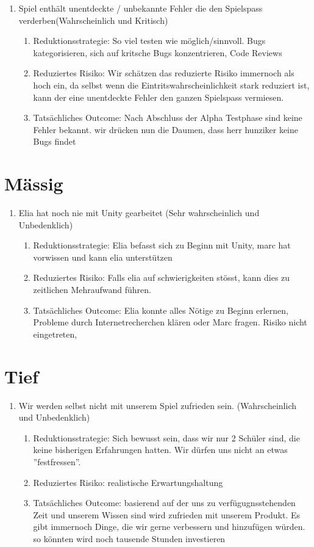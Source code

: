 \begin{enumerate}
    \item Spiel enthält unentdeckte / unbekannte Fehler die den Spielspass verderben(Wahrscheinlich und Kritisch)
    \begin{enumerate}
        \item Reduktionsstrategie: So viel testen wie möglich/sinnvoll. Bugs kategorisieren, sich auf kritsche Bugs konzentrieren, Code Reviews
        \item Reduziertes Risiko: Wir schätzen das reduzierte Risiko immernoch als hoch ein, da selbst wenn die Eintritswahrscheinlichkeit stark reduziert ist, kann der eine unentdeckte Fehler den ganzen Spielspass vermiesen.
        \item Tatsächliches Outcome: Nach Abschluss der Alpha Testphase sind keine Fehler bekannt. wir drücken nun die Daumen, dass herr hunziker keine Bugs findet
    \end{enumerate}


\end{enumerate}

\section{Mässig}
\begin{enumerate}
    \item Elia hat noch nie mit Unity gearbeitet (Sehr wahrscheinlich und Unbedenklich)
    \begin{enumerate}
        \item Reduktionsstrategie: Elia befasst sich zu Beginn mit Unity, marc hat vorwissen und kann elia unterstützen
        \item Reduziertes Risiko: Falls elia auf schwierigkeiten stösst, kann dies zu zeitlichen Mehraufwand führen.
        \item Tatsächliches Outcome: Elia konnte alles Nötige zu Beginn erlernen, Probleme durch Internetrecherchen klären oder Marc fragen. Risiko nicht eingetreten, 
    \end{enumerate}
\end{enumerate}

\section{Tief}
\begin{enumerate}
    \item Wir werden selbst nicht mit unserem Spiel zufrieden sein. (Wahrscheinlich und Unbedenklich)
    \begin{enumerate}
        \item Reduktionsstrategie: Sich bewusst sein, dass wir nur 2 Schüler sind, die keine bisherigen Erfahrungen hatten. Wir dürfen uns nicht an etwas ''festfressen''.
        \item Reduziertes Risiko: realistische Erwartungshaltung
        \item Tatsächliches Outcome: basierend auf der uns zu verfügugnsstehenden Zeit und unserem Wissen sind wird zufrieden mit unserem Produkt. Es gibt immernoch Dinge, die wir gerne verbessern und hinzufügen würden. so könnten wird noch tausende Stunden investieren
    \end{enumerate}
\end{enumerate}
